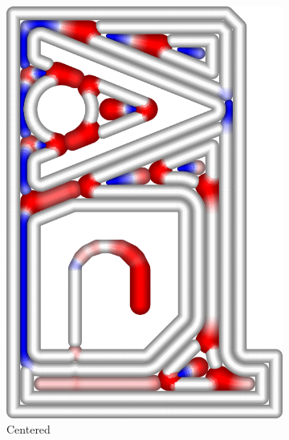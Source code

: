 \begin{figure}
\begin{subfigure}{\figwidth}
\includegraphics[height=\figheight]{sources/validation/gMAT_example/TEST_Center_widths.png}
\caption{Centered}\label{TEST_Center_accuracy}
\end{subfigure}
\begin{subfigure}{\figwidth}\centering

\end{subfigure}
\end{figure}
